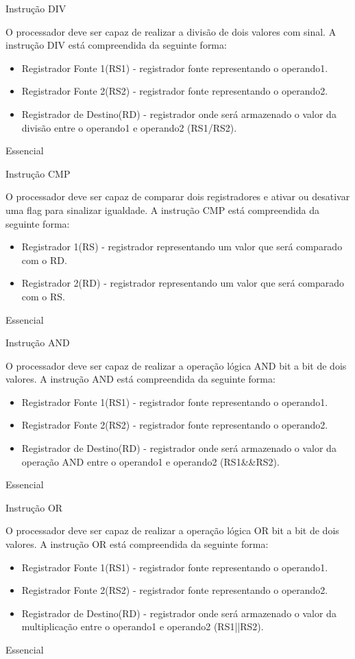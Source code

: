 \documentclass{article}
\begin{document}
\begin{functional}
       \requirement
      {Instrução DIV}
      {O processador deve ser capaz de realizar a divisão de dois valores com sinal.
      A instrução DIV está compreendida da seguinte forma:
       \begin{itemize}
        \item Registrador Fonte 1(RS1) - registrador fonte representando o operando1.
        \item Registrador Fonte 2(RS2) - registrador fonte representando o operando2.
        \item Registrador de Destino(RD) - registrador onde será armazenado o valor da divisão entre o operando1 e operando2 (RS1/RS2).
       \end{itemize}
       }
      {Essencial}

     \requirement
      {Instrução CMP}
      {O processador deve ser capaz de comparar dois registradores e ativar ou desativar uma flag para sinalizar igualdade.
      A instrução CMP está compreendida da seguinte forma:
      \begin{itemize}
       \item Registrador 1(RS) - registrador representando um valor que será comparado com o RD.
       \item Registrador 2(RD) - registrador representando um valor que será comparado com o RS.
      \end{itemize}
      }
      {Essencial}

      \requirement
      {Instrução AND}
      {O processador deve ser capaz de realizar a operação lógica AND bit a bit de dois valores.
      A instrução AND está compreendida da seguinte forma:
       \begin{itemize}
        \item Registrador Fonte 1(RS1) - registrador fonte representando o operando1.
        \item Registrador Fonte 2(RS2) - registrador fonte representando o operando2.
        \item Registrador de Destino(RD) - registrador onde será armazenado o valor da operação AND entre o operando1 e operando2 (RS1\&\&RS2).
       \end{itemize}
       }
      {Essencial}

      \requirement
      {Instrução OR}
      {O processador deve ser capaz de realizar a operação lógica OR bit a bit de dois valores.
      A instrução OR está compreendida da seguinte forma:
       \begin{itemize}
        \item Registrador Fonte 1(RS1) - registrador fonte representando o operando1.
        \item Registrador Fonte 2(RS2) - registrador fonte representando o operando2.
        \item Registrador de Destino(RD) - registrador onde será armazenado o valor da multiplicação entre o operando1 e operando2 (RS1||RS2).
       \end{itemize}
       }
      {Essencial}


\end{functional}
\end{document}
